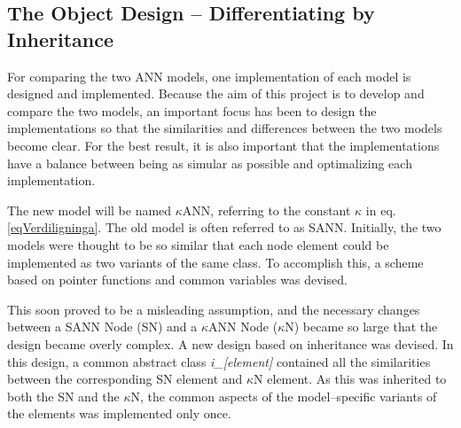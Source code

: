 	\subsection{The Object Design -- Differentiating by Inheritance} %
	\label{ssecDESIGN_ObjectDesign}

	For comparing the two ANN models, one implementation of each model is designed and implemented. 
	Because the aim of this project is to develop and compare the two models, an important focus has been to design the implementations so that the similarities and differences between the two models become clear.
	For the best result, it is also important that the implementations have a balance between being as simular as possible and optimalizing each implementation. %

	The new model will be named $\kappa$ANN, referring to the constant $\kappa$ in eq. \eqref{eqVerdiligninga}. The old model is often referred to as SANN.
	Initially, the two models were thought to be so similar that each node element could be implemented as two variants of the same class.
	To accomplish this, a scheme based on pointer functions and common variables was devised.

	This soon proved to be a misleading assumption, and the necessary changes between a SANN Node (SN) and a $\kappa$ANN Node ($\kappa$N) became so large that the design became overly complex.
	A new design based on inheritance was devised.
	In this design, a common abstract class \emph{i\_[element]} contained all the similarities between the corresponding SN element and $\kappa$N element.
	As this was inherited to both the SN and the $\kappa$N, the common aspects of the model--specific variants of the elements was implemented only once.

